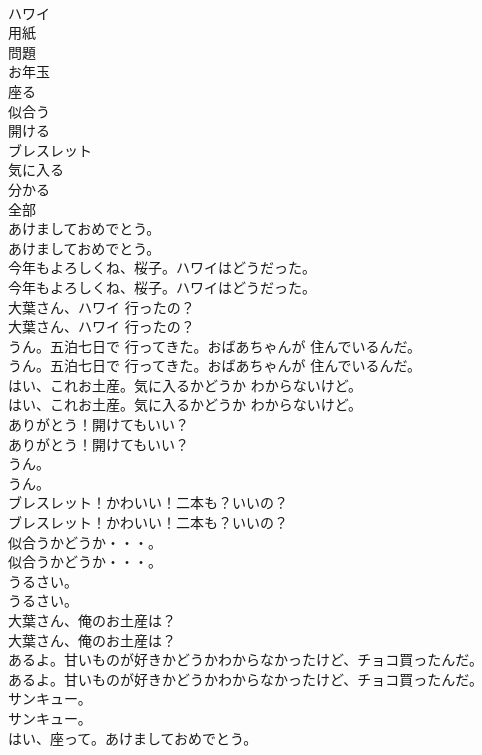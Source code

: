 \documentclass[8pt]{extreport}
\begin{document}
\begin{CJK}{UTF8}{min}
\\	ハワイ
\\	用紙
\\	問題
\\	お年玉
\\	座る
\\	似合う
\\	開ける
\\	ブレスレット
\\	気に入る
\\	分かる
\\	全部
\\	あけましておめでとう。	
\\	あけましておめでとう。 
\\	今年もよろしくね、桜子。ハワイはどうだった。	
\\	今年もよろしくね、桜子。ハワイはどうだった。 
\\	大葉さん、ハワイ 行ったの？	
\\	大葉さん、ハワイ 行ったの？ 
\\	うん。五泊七日で 行ってきた。おばあちゃんが 住んでいるんだ。	
\\	うん。五泊七日で 行ってきた。おばあちゃんが 住んでいるんだ。 
\\	はい、これお土産。気に入るかどうか わからないけど。	
\\	はい、これお土産。気に入るかどうか わからないけど。 
\\	ありがとう！開けてもいい？	
\\	ありがとう！開けてもいい？ 
\\	うん。	
\\	うん。 
\\	ブレスレット！かわいい！二本も？いいの？	
\\	ブレスレット！かわいい！二本も？いいの？ 
\\	似合うかどうか・・・。	
\\	似合うかどうか・・・。 
\\	うるさい。	
\\	うるさい。 
\\	大葉さん、俺のお土産は？	
\\	大葉さん、俺のお土産は？ 
\\	あるよ。甘いものが好きかどうかわからなかったけど、チョコ買ったんだ。	
\\	あるよ。甘いものが好きかどうかわからなかったけど、チョコ買ったんだ。 
\\	サンキュー。	
\\	サンキュー。 
\\	はい、座って。あけましておめでとう。	

\end{CJK}
\end{document}
